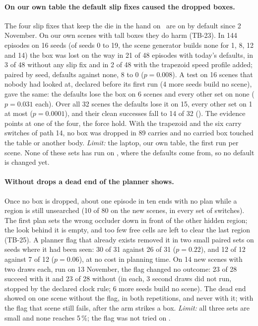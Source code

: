 \paragraph{On our own table the default slip fixes caused the dropped boxes.}
The four slip fixes that keep the die in the hand on \fdice\ are on by default since 2 November. On our own
scenes with tall boxes they do harm (TB-23). In 144 episodes on 16 seeds (of seeds 0 to 19, the scene generator
builds none for 1, 8, 12 and 14) the box was lost on the way in 21 of 48
episodes with today's defaults, in 3 of 48 without any slip fix and in 2 of 48 with the trapezoid speed profile
added; paired by seed, defaults against none, 8 to 0 ($p = 0.008$). A test on 16 scenes that nobody had looked at,
declared before its first run (4 more seeds build no scene), gave the same: the defaults lose the box on 6 scenes
and every other set on none ($p = 0.031$ each). Over all 32 scenes the defaults lose it on 15, every other set on
1 at most ($p = 0.0001$), and their clean successes fall to 14 of 32 (). The evidence points at one
of the four, the force hold. With the trapezoid and the six carry switches of path 14, no box was dropped in 89
carries and no carried box touched the table or another body.
\emph{Limit:} the laptop, our own table, the first run per scene. None of these sets has run on \fdice,
where the defaults come from, so no default is changed yet.

\paragraph{Without drops a dead end of the planner shows.}
Once no box is dropped, about one episode in ten ends with no plan while a region is still unsearched (10 of 80
on the new scenes, in every set of switches). The first plan sets the wrong occluder down in front of the other
hidden region; the look behind it is empty, and too few free cells are left to clear the last region (TB-25).
A planner flag that already exists removed it in two small paired sets on seeds where it had been seen: 30 of 31
against 26 of 31 ($p = 0.22$), and 12 of 12 against 7 of 12 ($p = 0.06$), at no cost in planning time. On 14 new
scenes with two draws each, run on 13 November, the flag changed no outcome: 23 of 28 succeed with it and 23 of 28
without (in each, 3 second draws did not run, stopped by the declared clock rule; 6 more seeds build no scene). The dead
end showed on one scene without the flag, in both repetitions, and never with it; with the flag that scene
still fails, after the arm strikes a box.
\emph{Limit:} all three sets are small and none reaches 5\,\%; the flag was not tried on \fdice.

